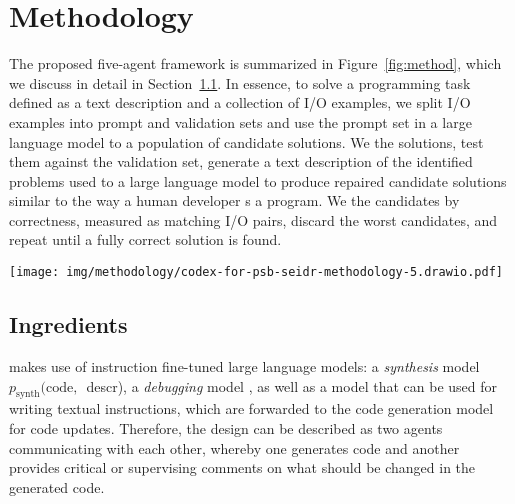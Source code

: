 \section{Methodology}
\label{sec:seidr-methodology}
The proposed five-agent \method{} framework  is summarized in Figure~\ref{fig:method}, which we discuss in detail in Section~\ref{sec:seidr-ingredients}.
In essence, to solve a programming task defined as a text description and a collection of I/O examples, we split I/O examples into prompt and validation sets and use the prompt set in a large language model to \synthesize{} a population of candidate solutions.
We \execute{} the solutions, test them against the validation set, generate a text description of the identified problems used to \instruct{} a large language model to produce repaired candidate solutions similar to the way a human developer \debug{}s a program.
We \rank{} the candidates
by correctness, measured as matching I/O pairs, discard the worst candidates, and repeat until a fully correct solution is found.

\begin{figure*}[t]
    \centering
    \texttt{[image: img/methodology/codex-for-psb-seidr-methodology-5.drawio.pdf]}
    \caption{Overview of \method{}, a multi-agent iterative framework that uses LLMs to implement the Synthesize, Execute, Instruct, Debug, and Rank feedback loop.}
    \label{fig:method}
\end{figure*}
 

\subsection{Ingredients}
\label{sec:seidr-ingredients}

\method{} makes use of instruction fine-tuned large language models: a \emph{synthesis} model $p_{\text{synth}}(\text{code, }$ descr), a \emph{debugging} model \debugmodel{}, as well as a model \textmodel{} that can be used for writing textual instructions, which are forwarded to the code generation model \debugmodelnoargs{} for code updates. 
Therefore, the design can be described as two agents communicating with each other, whereby one generates code and another provides critical or supervising comments on what should be changed in the generated code. 

